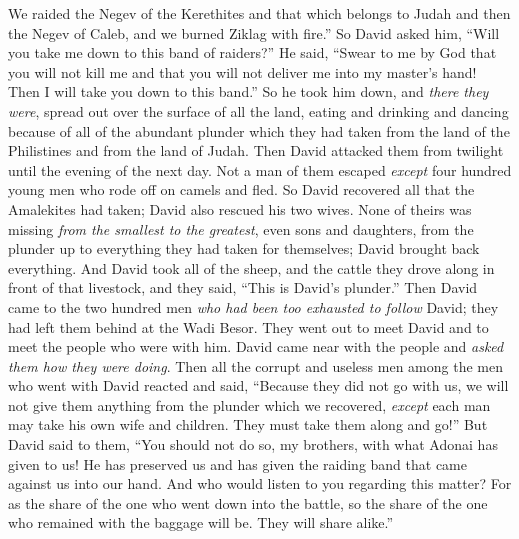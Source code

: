\begin{biblechapter}
\verse We raided the Negev of the Kerethites and that which belongs to Judah and then the Negev of Caleb, and we burned Ziklag with fire.”
\verse So David asked him, “Will you take me down to this band of raiders?” He said, “Swear to me by God that you will not kill me and that you will not deliver me into my master’s hand! Then I will take you down to this band.”
\verse So he took him down, and \textit{there they were}, spread out over the surface of all the land, eating and drinking and dancing because of all of the abundant plunder which they had taken from the land of the Philistines and from the land of Judah.
\verse Then David attacked them from twilight until the evening of the next day. Not a man of them escaped \textit{except} four hundred young men who rode off on camels and fled.
\verse So David recovered all that the Amalekites had taken; David also rescued his two wives.
\verse None of theirs was missing \textit{from the smallest to the greatest}, even sons and daughters, from the plunder up to everything they had taken for themselves; David brought back everything.
\verse And David took all of the sheep, and the cattle they drove along in front of that livestock, and they said, “This is David’s plunder.”
\verse Then David came to the two hundred men \textit{who had been too exhausted to follow} David; they had left them behind at the Wadi Besor. They went out to meet David and to meet the people who were with him. David came near with the people and \textit{asked them how they were doing}.
\verse Then all the corrupt and useless men among the men who went with David reacted and said, “Because they did not go with us, we will not give them anything from the plunder which we recovered, \textit{except} each man may take his own wife and children. They must take them along and go!”
\verse But David said to them, “You should not do so, my brothers, with what Adonai has given to us! He has preserved us and has given the raiding band that came against us into our hand.
\verse And who would listen to you regarding this matter? For as the share of the one who went down into the battle, so the share of the one who remained with the baggage will be. They will share alike.”

\end{biblechapter}
